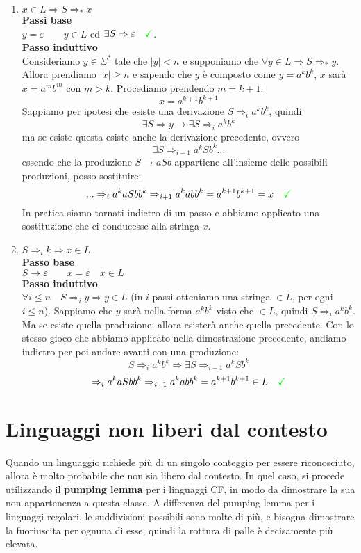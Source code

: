 \documentclass[a4paper,oneside]{scrbook}
\newcommand{\greenmark}{\quad \textcolor{green}{\checkmark}}
\begin{document}
\begin{enumerate}
	\item $x\in L \Rightarrow S \Rightarrow_* x $\\
	\textbf{Passi base}\\
	$y=\varepsilon \qquad y \in L$ ed $\exists S\Rightarrow \varepsilon \greenmark$.\\
	\textbf{Passo induttivo}\\
	Consideriamo $y \in \Sigma^*$ tale che $|y|<n$ e supponiamo che $\forall y \in L \Rightarrow S \Rightarrow_* y$.\\
	Allora prendiamo $|x|\geq n$ e sapendo che $y$ è composto come $y=a^kb^k$, $x$ sarà $x=a^mb^m$ con $m>k$. Procediamo prendendo $m=k+1$:
	$$ x=a^{k+1}b^{k+1}$$
	Sappiamo per ipotesi che esiste una derivazione  $S\Rightarrow_i a^kb^k$, quindi
	$$\exists S \Rightarrow y \rightarrow \exists S \Rightarrow_i a^kb^k$$
	ma se esiste questa esiste anche la derivazione precedente, ovvero
	$$\exists S \Rightarrow_{i-1} a^{k}Sb^{k} ...$$
	essendo che la produzione $S\rightarrow aSb$ appartiene all'insieme delle possibili produzioni, posso sostituire:
	$$... \Rightarrow_i a^{k}aSbb^{k} \Rightarrow_{i+1} a^kabb^k = a^{k+1}b^{k+1} = x \greenmark$$
	In pratica siamo tornati indietro di un passo e abbiamo applicato una sostituzione che ci conducesse alla stringa $x$.
	
	\item $ S \Rightarrow_i k \Rightarrow x \in L$\\
	\textbf{Passo base}\\
	$S\rightarrow \varepsilon \qquad x=\varepsilon \quad x \in L$\\
	\textbf{Passo induttivo}\\
	$\forall i \leq n \quad S \Rightarrow_i y \Rightarrow y \in L $ (in $i$ passi otteniamo una stringa $\in L$, per ogni $i\leq n$).
	Sappiamo che $y$ sarà nella forma $a^kb^k$ visto che $\in L$, quindi $S \Rightarrow_i a^kb^k$. Ma se esiste quella produzione, allora
	esisterà anche quella precedente. Con lo stesso gioco che abbiamo applicato nella dimostrazione precedente, andiamo indietro per poi
	andare avanti con una produzione:
	$$S \Rightarrow_i a^kb^k \Rightarrow \exists S \Rightarrow_{i-1} a^{k}Sb^{k}$$
	$$\Rightarrow_i a^{k}aSbb^{k} \Rightarrow_{i+1} a^kabb^k = a^{k+1}b^{k+1} \in L \greenmark$$
\end{enumerate}

\chapter{Linguaggi non liberi dal contesto}
Quando un linguaggio richiede più di un singolo conteggio per essere riconosciuto, allora è molto probabile che non sia libero dal contesto.
In quel caso, si procede utilizzando il \textbf{pumping lemma} per i linguaggi CF, in modo da dimostrare la sua non appartenenza a questa classe.
A differenza del pumping lemma per i linguaggi regolari, le suddivisioni possibili sono molte di più, e bisogna dimostrare la fuoriuscita per ognuna di esse, quindi la rottura di palle è decisamente più elevata.
\end{document}
